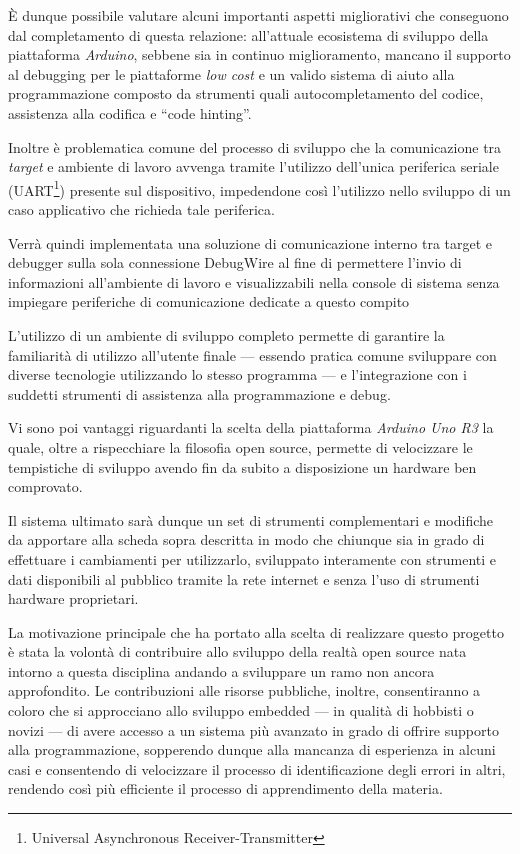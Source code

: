 È dunque possibile valutare alcuni importanti aspetti migliorativi che conseguono dal completamento di questa relazione: all'attuale ecosistema di sviluppo della piattaforma \textit{Arduino}, sebbene sia in continuo miglioramento, mancano il supporto al debugging per le piattaforme \textit{low cost} e un valido sistema di aiuto alla programmazione composto da strumenti quali autocompletamento del codice, assistenza alla codifica e ``code hinting''.

Inoltre è problematica comune del processo di sviluppo che la comunicazione tra \textit{target} e ambiente di lavoro avvenga tramite l'utilizzo dell'unica periferica seriale (UART\footnote{Universal Asynchronous Receiver-Transmitter}) presente sul dispositivo, impedendone così l'utilizzo nello sviluppo di un caso applicativo che richieda tale periferica.

Verrà quindi implementata una soluzione di comunicazione interno tra target e debugger sulla sola connessione DebugWire al fine di permettere l'invio di informazioni all'ambiente di lavoro e visualizzabili nella console di sistema senza impiegare periferiche di comunicazione dedicate a questo compito

L'utilizzo di un ambiente di sviluppo completo permette di garantire la familiarità di utilizzo all'utente finale --- essendo pratica comune sviluppare con diverse tecnologie utilizzando lo stesso programma --- e l'integrazione con i suddetti strumenti di assistenza alla programmazione e debug.

Vi sono poi vantaggi riguardanti la scelta della piattaforma \textit{Arduino Uno R3} la quale, oltre a rispecchiare la filosofia open source, permette di velocizzare le tempistiche di sviluppo avendo fin da subito a disposizione un hardware ben comprovato.\cite{site:arduino-mini-le}

Il sistema ultimato sarà dunque un set di strumenti complementari e modifiche da apportare alla scheda sopra descritta in modo che chiunque sia in grado di effettuare i cambiamenti per utilizzarlo, sviluppato interamente con strumenti e dati disponibili al pubblico tramite la rete internet e senza l'uso di strumenti hardware proprietari.

La motivazione principale che ha portato alla scelta di realizzare questo progetto è stata la volontà di contribuire allo sviluppo della realtà open source nata intorno a questa disciplina andando a sviluppare un ramo non ancora approfondito. 
Le contribuzioni alle risorse pubbliche, inoltre, consentiranno a coloro che si approcciano allo sviluppo embedded --- in qualità di hobbisti o novizi --- di avere accesso a un sistema più avanzato in grado di offrire supporto alla programmazione, sopperendo dunque alla mancanza di esperienza in alcuni casi e consentendo di velocizzare il processo di identificazione degli errori in altri, rendendo così più efficiente il processo di apprendimento della materia.